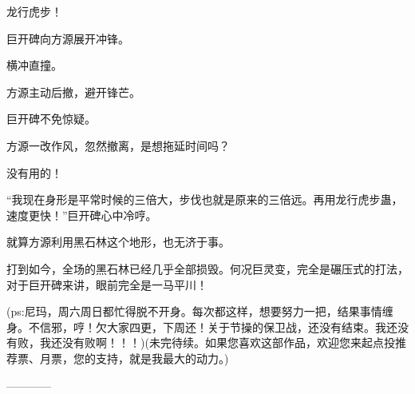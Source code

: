 \begin{this_body}
龙行虎步！

巨开碑向方源展开冲锋。

横冲直撞。

方源主动后撤，避开锋芒。

巨开碑不免惊疑。

方源一改作风，忽然撤离，是想拖延时间吗？

没有用的！

“我现在身形是平常时候的三倍大，步伐也就是原来的三倍远。再用龙行虎步蛊，速度更快！”巨开碑心中冷哼。

就算方源利用黑石林这个地形，也无济于事。

打到如今，全场的黑石林已经几乎全部损毁。何况巨灵变，完全是碾压式的打法，对于巨开碑来讲，眼前完全是一马平川！

(ps:尼玛，周六周日都忙得脱不开身。每次都这样，想要努力一把，结果事情缠身。不信邪，哼！欠大家四更，下周还！关于节操的保卫战，还没有结束。我还没有败，我还没有败啊！！！)(未完待续。如果您喜欢这部作品，欢迎您来起点投推荐票、月票，您的支持，就是我最大的动力。)

------------

\end{this_body}

